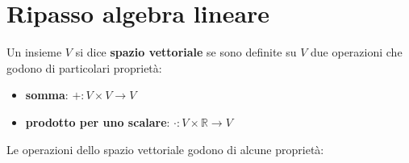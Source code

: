 \chapter{Ripasso algebra lineare}
\begin{definizione} 
    Un insieme $V$ si dice \textbf{spazio vettoriale} se sono definite su $V$ due
    operazioni che godono di particolari proprietà:
    \begin{itemize}
        \item \textbf{somma}: $+:V\times V\rightarrow V$
        \item \textbf{prodotto per uno scalare}: $\cdot : V\times \mathbb{R}\rightarrow V$
    \end{itemize}
\end{definizione}

Le operazioni dello spazio vettoriale godono di alcune proprietà:
